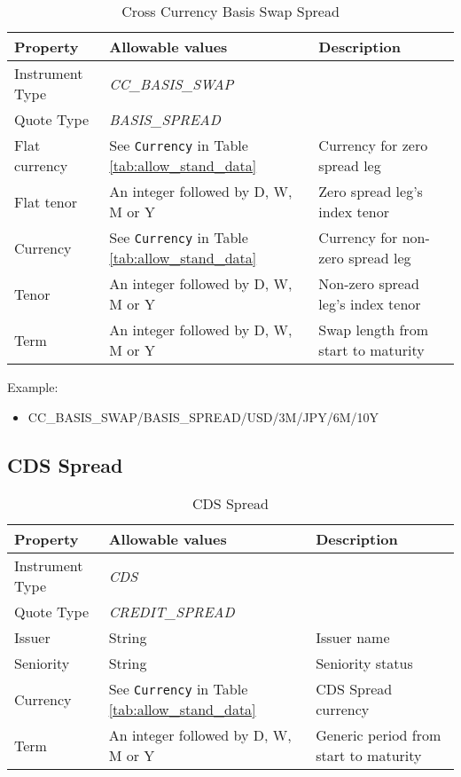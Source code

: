 \begin{table}[H]
\centering
  \begin{tabular}{|p{3cm}|p{3.5cm}|p{7cm}|}
    \hline
    {\bf Property} & {\bf Allowable values} & {\bf Description} \\ \hline
    Instrument Type & \emph{CC\_BASIS\_SWAP} & \\ \hline
    Quote Type & \emph{BASIS\_SPREAD} & \\ \hline
    Flat currency & See \lstinline!Currency! in Table \ref{tab:allow_stand_data} & Currency for zero spread leg\\  \hline
    Flat tenor & An integer followed by D, W, M or Y & Zero spread leg's index tenor\\ \hline
    Currency & See \lstinline!Currency! in Table \ref{tab:allow_stand_data}& Currency for non-zero spread leg\\ \hline
    Tenor & An integer followed by D, W, M or Y & Non-zero spread leg's index tenor\\ \hline
    Term & An integer followed by D, W, M or Y & Swap length from start to maturity\\ \hline
  \end{tabular}
  \caption{Cross Currency Basis Swap Spread}
  \label{tab:ccbasisspread_quote}
\end{table}


\medskip
Example:
\begin{itemize}
\item {CC\_BASIS\_SWAP/BASIS\_SPREAD/USD/3M/JPY/6M/10Y}
\end{itemize}

\subsection{CDS Spread}

\begin{table}[H]
\centering
  \begin{tabular}{|p{3cm}|p{3.5cm}|p{7cm}|}
    \hline
    {\bf Property} & {\bf Allowable values} & {\bf Description} \\ \hline
    Instrument Type & \emph{CDS} & \\ \hline
    Quote Type & \emph{CREDIT\_SPREAD} & \\ \hline
    Issuer & String &  Issuer name \\ \hline
    Seniority & String &  Seniority status \\ \hline
    Currency & See \lstinline!Currency! in Table \ref{tab:allow_stand_data} & CDS Spread currency\\ \hline
    Term & An integer followed by D, W, M or Y & Generic period from start to maturity\\ \hline
  \end{tabular}
  \caption{CDS Spread}
  \label{tab:cdsspread_quote}
\end{table}

